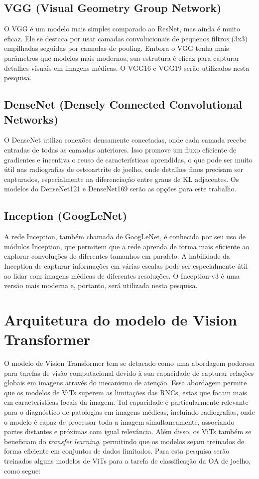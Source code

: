 \subsection{VGG (Visual Geometry Group Network)}

O VGG é um modelo mais simples comparado ao ResNet, mas ainda é muito eficaz. Ele se destaca por usar camadas convolucionais de pequenos filtros (3x3) empilhadas seguidas por camadas de pooling. Embora o VGG tenha mais parâmetros que modelos mais modernos, sua estrutura é eficaz para capturar detalhes visuais em imagens médicas. O VGG16 e VGG19 serão utilizados nesta pesquisa.

\subsection{DenseNet (Densely Connected Convolutional Networks)}

O DenseNet utiliza conexões densamente conectadas, onde cada camada recebe entradas de todas as camadas anteriores. Isso promove um fluxo eficiente de gradientes e incentiva o reuso de características aprendidas, o que pode ser muito útil nas radiografias de osteoartrite de joelho, onde detalhes finos precisam ser capturados, especialmente na diferenciação entre graus de KL adjacentes. Os modelos do DenseNet121 e DenseNet169 serão as opções para este trabalho.

\subsection{Inception (GoogLeNet)}

A rede Inception, também chamada de GoogLeNet, é conhecida por seu uso de módulos Inception, que permitem que a rede aprenda de forma mais eficiente ao explorar convoluções de diferentes tamanhos em paralelo. A habilidade da Inception de capturar informações em várias escalas pode ser especialmente útil ao lidar com imagens médicas de diferentes resoluções. O Inception-v3 é uma versão mais moderna e, portanto, será utilizada nesta pesquisa.

\section{Arquitetura do modelo de Vision Transformer}

O modelo de Vision Transformer tem se detacado como uma abordagem poderosa para tarefas de visão computacional devido à sua capacidade de capturar relações globais em imagens através do mecanismo de atenção. Essa abordagem permite que os modelos de ViTs superem as limitações das RNCs, estas que focam mais em características locais da imagem. Tal capacidade é particularmente relevante para o diagnóstico de patologias em imagens médicas, incluindo radiografias, onde o modelo é capaz de processar toda a imagem simultaneamente, associando partes distantes e próximas com igual relevância. Além disso, os ViTs também se beneficiam do \textit{transfer learning}, permitindo que os modelos sejam treinados de forma eficiente em conjuntos de dados limitados. Para esta pesquisa serão treinados alguns modelos de ViTs para a tarefa de classificação da OA de joelho, como segue:

